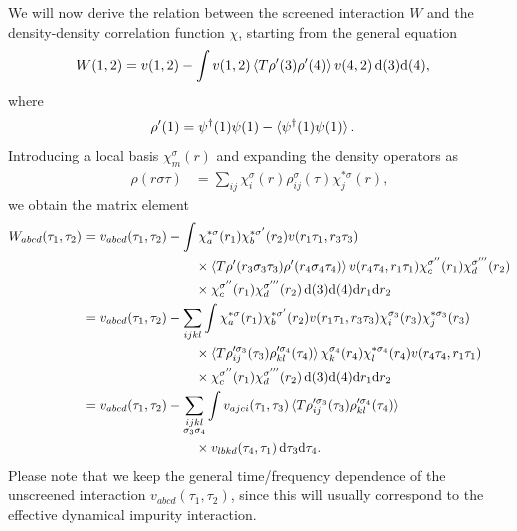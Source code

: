 \documentclass[12pt,a4paper]{scrartcl}
\numberwithin{equation}{section}
\begin{document}
We will now derive the relation between the screened interaction $W$ and the density-density
correlation function $\chi$, starting from the general equation
\begin{align}
W(1,2)
&=v(1,2) - \int v(1,2) \braket{T\rho'(3)\rho'(4)} v(4,2) \, \mathrm{d}(3)\mathrm{d}(4), 
\end{align}
where
\begin{align}
 \rho'(1) &= \psi^{\dagger}(1)\psi(1) - \braket{ \psi^{\dagger}(1)\psi(1) }.
\end{align}
Introducing a local basis $\chi^{\sigma}_m(r)$ and expanding the density operators as
\begin{align}
\rho(r\sigma\tau) &= \sum_{ij} \chi^{\sigma}_i(r) \rho^{\sigma}_{ij}(\tau) \chi^{*\sigma}_j(r),
\end{align}
we obtain the matrix element
\begin{align}
W_{abcd}(\tau_1,\tau_2) 
&= v_{abcd}(\tau_1,\tau_2)  
- \int \chi^{*\sigma}_a(r_1)\chi^{*\sigma'}_b(r_2) v(r_1\tau_1,r_3\tau_3)   \nonumber \\
            & \hspace{3cm} \times \braket{T\rho'(r_3\sigma_3\tau_3)\rho'(r_4\sigma_4\tau_4)}
                            v(r_4\tau_4,r_1\tau_1) \chi^{\sigma''}_c(r_1)\chi^{\sigma'''}_d(r_2) \nonumber \\
            &\hspace{3cm} \times \chi^{\sigma''}_c(r_1)\chi^{\sigma'''}_d(r_2)
                                             \, \mathrm{d}(3)\mathrm{d}(4) \mathrm{d}r_1 \mathrm{d}r_2 \\
%
&= v_{abcd}(\tau_1,\tau_2)  
- \sum_{ijkl}\int \chi^{*\sigma}_a(r_1)\chi^{*\sigma'}_b(r_2)
                                    v(r_1\tau_1,r_3\tau_3) \chi^{\sigma_3}_i(r_3) \chi^{*\sigma_3}_j(r_3) \nonumber\\
               &\hspace{3cm} \times   \braket{T\rho'^{\sigma_3}_{ij}(\tau_3)\rho'^{\sigma_4}_{kl}(\tau_4)}
                            \chi^{\sigma_4}_k(r_4) \chi^{*\sigma_4}_l(r_4)
                            v(r_4\tau_4,r_1\tau_1)                                         \nonumber \\
               &\hspace{3cm} \times  \chi^{\sigma''}_c(r_1)\chi^{\sigma'''}_d(r_2)
                                                        \, \mathrm{d}(3)\mathrm{d}(4) \mathrm{d}r_1 \mathrm{d}r_2 \\
%
&= v_{abcd}(\tau_1,\tau_2)  
- \sum_{\substack{ijkl\\ \sigma_3\sigma_4}}\int v_{ajci}(\tau_1,\tau_3)  \braket{T\rho'^{\sigma_3}_{ij}(\tau_3)\rho'^{\sigma_4}_{kl}(\tau_4)}    \nonumber\\
               &\hspace{3cm} \times   v_{lbkd}(\tau_4,\tau_1)   \, \mathrm{d}\tau_3 \mathrm{d}\tau_4 .
\end{align}
Please note that we keep the general time/frequency dependence of the unscreened interaction
$v_{abcd}(\tau_1,\tau_2)$, since this will usually correspond to the effective dynamical
impurity interaction.
\end{document}

